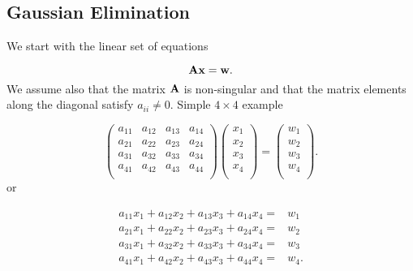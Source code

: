 \documentclass[%
twoside,                 %
final,                   %
10pt]{article}
\begin{document}
{{\ecppcod

\subsection{Gaussian Elimination}

We start with the linear set of equations

\[
   {\bf A}{\bf x} = {\bf w}.
\]
We assume also that the matrix ${\bf A}$ is non-singular and that the
matrix elements along the diagonal satisfy $a_{ii} \ne 0$. Simple $4\times 4 $ example

\[
\left(\begin{array}{cccc}
                           a_{11}& a_{12} &a_{13}& a_{14}\\
                           a_{21}& a_{22} &a_{23}& a_{24}\\
                           a_{31}& a_{32} &a_{33}& a_{34}\\
                           a_{41}& a_{42} &a_{43}& a_{44}\\
                      \end{array} \right)\left(\begin{array}{c}
                           x_1\\
                           x_2\\
                           x_3 \\
                           x_4  \\
                      \end{array} \right)
  =\left(\begin{array}{c}
                           w_1\\
                           w_2\\
                           w_3 \\
                           w_4\\
                      \end{array} \right).
\]
or

\begin{align}
 a_{11}x_1 +a_{12}x_2 +a_{13}x_3 + a_{14}x_4=&w_1 \nonumber \\
a_{21}x_1 + a_{22}x_2 + a_{23}x_3 + a_{24}x_4=&w_2 \nonumber \\
a_{31}x_1 + a_{32}x_2 + a_{33}x_3 + a_{34}x_4=&w_3 \nonumber \\
a_{41}x_1 + a_{42}x_2 + a_{43}x_3 + a_{44}x_4=&w_4. \nonumber
\end{align}

}}
\end{document}
